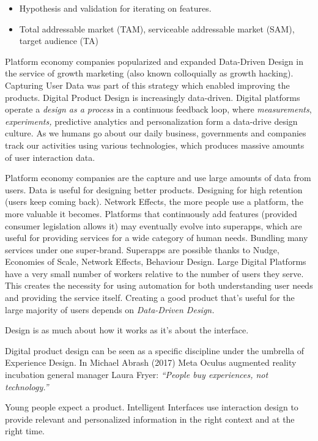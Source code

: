 \documentclass[
  letterpaper,
  DIV=11,
  numbers=noendperiod]{scrartcl}
\begin{document}
\begin{itemize}
\item
  Hypothesis and validation for iterating on features.
\item
  Total addressable market (TAM), serviceable addressable market (SAM),
  target audience (TA)
\end{itemize}

Platform economy companies popularized and expanded Data-Driven Design
in the service of growth marketing (also known colloquially as growth
hacking). Capturing User Data was part of this strategy which enabled
improving the products. Digital Product Design is increasingly
data-driven. Digital platforms operate a \emph{design as a process} in a
continuous feedback loop, where \emph{measurements}, \emph{experiments,}
predictive analytics and personalization form a data-drive design
culture. As we humans go about our daily business, governments and
companies track our activities using various technologies, which
produces massive amounts of user interaction data.

Platform economy companies are the capture and use large amounts of data
from users. Data is useful for designing better products. Designing for
high retention (users keep coming back). Network Effects, the more
people use a platform, the more valuable it becomes. Platforms that
continuously add features (provided consumer legislation allows it) may
eventually evolve into superapps, which are useful for providing
services for a wide category of human needs. Bundling many services
under one super-brand. Superapps are possible thanks to Nudge, Economies
of Scale, Network Effects, Behaviour Design. Large Digital Platforms
have a very small number of workers relative to the number of users they
serve. This creates the necessity for using automation for both
understanding user needs and providing the service itself. Creating a
good product that's useful for the large majority of users depends on
\emph{Data-Driven Design.}

Design is as much about how it works as it's about the interface.

Digital product design can be seen as a specific discipline under the
umbrella of Experience Design. In Michael Abrash (2017) Meta Oculus
augmented reality incubation general manager Laura Fryer: \emph{``People
buy experiences, not technology.''}

Young people expect a product. Intelligent Interfaces use interaction
design to provide relevant and personalized information in the right
context and at the right time.
\end{document}

